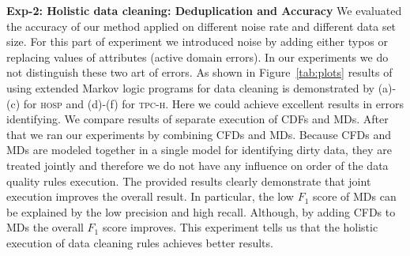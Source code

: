 \textbf{Exp-2: Holistic data cleaning: Deduplication and Accuracy} We evaluated the accuracy of our method applied on different noise rate and different data set size. For this part of experiment we introduced noise by adding either typos or replacing values of attributes (active domain errors). In our experiments we do not distinguish these two art of errors. As shown in Figure~\ref{tab:plots} results of using extended Markov logic programs for data cleaning is demonstrated by (a)-(c) for \textsc{hosp} and (d)-(f) for \textsc{tpc-h}. Here we could achieve excellent results in errors identifying. We compare results of separate execution of CDFs and MDs. After that we ran our experiments by combining CFDs and MDs. Because CFDs and MDs are modeled together in a single model for identifying dirty data, they are treated jointly and therefore we do not have any influence on order of the data quality rules execution. The provided results clearly demonstrate that joint execution improves the overall result. In particular, the low $F_1$ score of MDs can be explained by the low precision and high recall. Although, by adding CFDs to MDs the overall $F_1$ score improves. This experiment tells us that the holistic execution of data cleaning rules achieves better results. 


